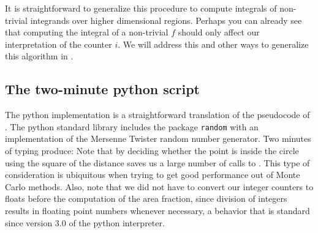 It is straightforward to generalize this procedure to compute integrals of non-trivial
integrands over higher dimensional regions. Perhaps you can already see that computing the
integral of a non-trivial $f$ should only affect our interpretation of the counter $i$. We will
address this and other ways to generalize this algorithm in .

\subsection{The two-minute python script}
\label{sec:simple:python}

The python implementation is a straightforward translation of the pseudocode of
. The python standard library\supercite{python-doc} includes the package {\tt random}
with an implementation of the Mersenne Twister\supercite{mersenne-twister} random number
generator. Two minutes of typing produce:
%
%
Note that by deciding whether the point is inside the circle using the square of the distance
saves us a large number of calls to . This type of consideration is ubiquitous
when trying to get good performance out of Monte Carlo methods.  Also, note that we did not
have to convert our integer counters to floats before the computation of the area fraction,
since division of integers results in floating point numbers whenever necessary, a behavior
that is standard since version 3.0 of the python interpreter.

